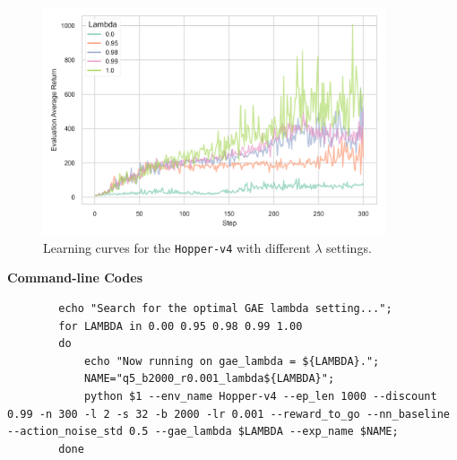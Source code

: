 \documentclass[10pt, letterpaper]{article}
\begin{document}
    \begin{figure}[thbp]
       \centering
       \includegraphics[width=0.9\textwidth]{exp_05.png} 
       \caption{Learning curves for the \texttt{Hopper-v4} with different $\lambda$ settings.}
       \label{fig:6}
    \end{figure}

    \textbf{Command-line Codes}
    \begin{lstlisting}
        echo "Search for the optimal GAE lambda setting...";
        for LAMBDA in 0.00 0.95 0.98 0.99 1.00
        do
            echo "Now running on gae_lambda = ${LAMBDA}.";
            NAME="q5_b2000_r0.001_lambda${LAMBDA}";
            python $1 --env_name Hopper-v4 --ep_len 1000 --discount 0.99 -n 300 -l 2 -s 32 -b 2000 -lr 0.001 --reward_to_go --nn_baseline --action_noise_std 0.5 --gae_lambda $LAMBDA --exp_name $NAME;
        done
    \end{lstlisting}
    
\end{document}
